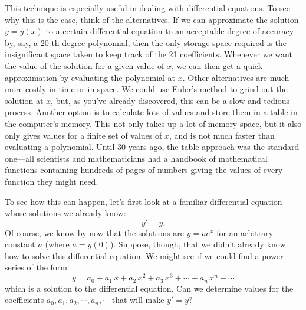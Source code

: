 {{{{This technique is especially useful in dealing with differential equations.  To see why this is the case, think of the alternatives.  If we
can approximate the solution $y=y(x)$ to a certain differential equation to an acceptable degree of accuracy by, say, a 20-th degree polynomial, then the only storage space required is the insignificant space taken to keep track of the 21 coefficients.  Whenever we want the value of the solution for a given value of $x$, we can then get a quick approximation by evaluating the polynomial at $x$.  Other alternatives are much more costly in time or in space.  We could use Euler's method to grind out the solution at $x$, but, as you've already discovered, this can be a slow and tedious process.  Another option is to calculate lots of values and store them in a table in the computer's memory.  This not only takes up a lot of memory space, but it also only gives values for a finite set of values of $x$, and is not much faster than evaluating a polynomial.  Until 30 years ago, the table approach was the standard one---all scientists and mathematicians had a handbook of mathematical functions containing hundreds of pages of numbers giving the values of every function they might need.

 

To see how this can happen, let's first look at a familiar differential equation whose solutions we already know:
\[
y'=y.
\]
Of course, we know by now that the solutions are $y=ae^x$ for an arbitrary constant $a$ (where $a=y(0)$).  Suppose, though, that we didn't already know how to solve this differential equation.  We might see if we could find a power series of the form
\[
y = a_0 + a_1\,x + a_2\, x^2 + a_3\, x^3 + \cdots + a_n\, x^n + \cdots
\]
which is a solution to the differential equation.  Can we determine values for the coefficients $a_0, a_1, a_2, \cdots , a_n , \cdots $ that will make $y'=y$?

}}}}
